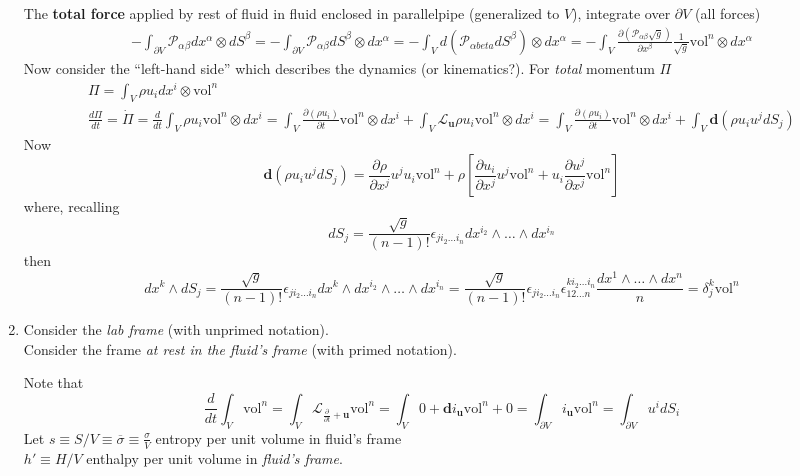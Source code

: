 \documentclass[10pt]{amsart}
\begin{document}
\begin{multicols*}{2}
\begin{enumerate}
The \textbf{total force} applied by rest of fluid in fluid enclosed in parallelpipe (generalized to $V$), integrate over $\partial V$ (all forces)
\[
\begin{gathered}
  -\int_{\partial V} \mathcal{P}_{\alpha \beta} dx^{\alpha} \otimes dS^{\beta} = -\int_{ \partial V} \mathcal{P}_{\alpha \beta} dS^{\beta} \otimes dx^{\alpha} = -\int_V d(\mathcal{P}_{\alpha beta} dS^{\beta}) \otimes dx^{\alpha} = -\int_V \frac{ \partial (\mathcal{P}_{\alpha \beta}\sqrt{g})}{ \partial x^{\beta} } \frac{1}{\sqrt{g}} \text{vol}^n \otimes dx^{\alpha}
\end{gathered}
\]
Now consider the ``left-hand side'' which describes the dynamics (or kinematics?).  For \emph{total} momentum $\Pi$
\[
\begin{gathered}
  \Pi = \int_V \rho u_i dx^i \otimes \text{vol}^n \\ 
  \frac{d\Pi}{dt} = \dot{\Pi} = \frac{d}{dt} \int_V \rho u_i \text{vol}^n \otimes dx^i =\int_V \frac{ \partial (\rho u_i )}{ \partial t} \text{vol}^n \otimes dx^i + \int_V \mathcal{L}_{\mathbf{u}} \rho u_i \text{vol}^n \otimes dx^i = \int_V \frac{ \partial ( \rho u_i ) }{ \partial t} \text{vol}^n \otimes dx^i + \int_V \mathbf{d}(\rho u_i u^j dS_j )
\end{gathered}
\]
Now
\[
\mathbf{d}(\rho u_i u^j dS_j) = \frac{ \partial \rho }{ \partial x^j} u^j u_i \text{vol}^n + \rho \left[ \frac{ \partial u_i}{ \partial x^j} u^j \text{vol}^n + u_i \frac{ \partial u^j}{ \partial x^j} \text{vol}^n \right]
\]
where, recalling
\[
dS_j = \frac{\sqrt{g}}{ (n-1)!} \epsilon_{ji_2 \dots i_n} dx^{i_2} \wedge \dots \wedge dx^{i_n}
\]
then
\[
dx^k \wedge dS_j = \frac{\sqrt{g}}{ (n-1)!} \epsilon_{ji_2 \dots i_n} dx^k \wedge dx^{i_2} \wedge \dots \wedge dx^{i_n} = \frac{ \sqrt{g}}{ (n-1)!} \epsilon_{ji_2 \dots i_n} \epsilon^{ki_2 \dots i_n}_{12\dots n} \frac{dx^1 \wedge \dots \wedge dx^n}{n} = \delta_j^k \text{vol}^n
\]
  \item Consider the \emph{lab frame} (with unprimed notation).  \\
Consider the frame \emph{at rest in the fluid's frame} (with primed notation).  

Note that 
\[
\frac{d}{dt} \int_V \text{vol}^n = \int_V \mathcal{L}_{\frac{\partial}{\partial t} + \mathbf{u}} \text{vol}^n = \int_V 0 + \mathbf{d}i_{\mathbf{u}} \text{vol}^n + 0 = \int_{\partial V} i_{\mathbf{u}} \text{vol}^n = \int_{\partial V} u^i dS_i
\]
Let $s\equiv S/V \equiv \overline{\sigma} \equiv \frac{\sigma}{V}$ entropy per unit volume in fluid's frame \\
\phantom{Let } $h' \equiv H/V$ enthalpy per unit volume in \emph{fluid's frame}.  


\end{enumerate}
\end{multicols*}
\end{document}
